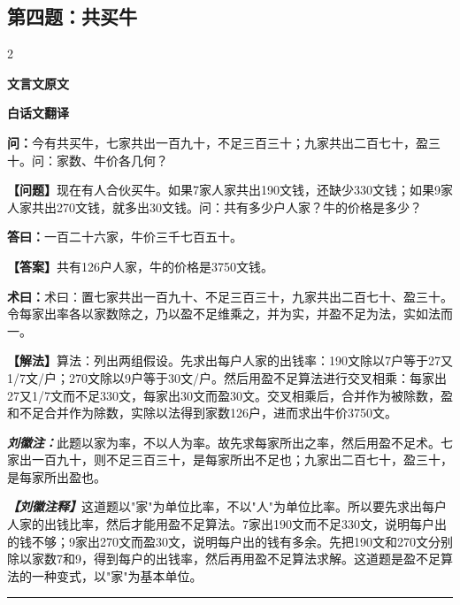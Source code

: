 \documentclass[10pt,a4paper]{article}
\newcommand{\wen}[1]{\textbf{\color{problemcolor}问：}#1\par}
\newcommand{\da}[1]{\textbf{答曰：}#1\par}
\newcommand{\shu}[1]{\textbf{术曰：}#1\par}
\newcommand{\liuhui}[1]{{\color{commentarycolor}\textit{\textbf{刘徽注：}}#1\par}}
\newcommand{\classicalheader}[1]{{\centering\large\bfseries\color{classicalcolor} #1\par\vspace{0.5em}}}
\newcommand{\wenmodern}[1]{\textbf{\color{moderncolor}【问题】}#1\par}
\newcommand{\damodern}[1]{\textbf{【答案】}#1\par}
\newcommand{\shumodern}[1]{\textbf{【解法】}#1\par}
\newcommand{\liuhuimodern}[1]{{\color{commentarycolor}\textit{\textbf{【刘徽注释】}}#1\par}}
\newcommand{\modernheader}[1]{{\centering\large\bfseries\color{moderncolor} #1\par\vspace{0.5em}}}
\newcommand{\problemsec}[1]{\subsection*{#1}}
\begin{document}
\problemsec{第四题：共买牛}
\begin{paracol}{2}
\classicalheader{文言文原文}
\switchcolumn
\modernheader{白话文翻译}
\switchcolumn*

\wen{今有共买牛，七家共出一百九十，不足三百三十；九家共出二百七十，盈三十。问：家数、牛价各几何？}

\switchcolumn

\wenmodern{现在有人合伙买牛。如果7家人家共出190文钱，还缺少330文钱；如果9家人家共出270文钱，就多出30文钱。问：共有多少户人家？牛的价格是多少？}

\switchcolumn*

\da{一百二十六家，牛价三千七百五十。}

\switchcolumn

\damodern{共有126户人家，牛的价格是3750文钱。}

\switchcolumn*

\shu{术曰：置七家共出一百九十、不足三百三十，九家共出二百七十、盈三十。令每家出率各以家数除之，乃以盈不足维乘之，并为实，并盈不足为法，实如法而一。}

\switchcolumn

\shumodern{算法：列出两组假设。先求出每户人家的出钱率：190文除以7户等于27又1/7文/户；270文除以9户等于30文/户。然后用盈不足算法进行交叉相乘：每家出27又1/7文而不足330文，每家出30文而盈30文。交叉相乘后，合并作为被除数，盈和不足合并作为除数，实除以法得到家数126户，进而求出牛价3750文。}

\switchcolumn*

\liuhui{此题以家为率，不以人为率。故先求每家所出之率，然后用盈不足术。七家出一百九十，则不足三百三十，是每家所出不足也；九家出二百七十，盈三十，是每家所出盈也。}

\switchcolumn

\liuhuimodern{这道题以"家"为单位比率，不以"人"为单位比率。所以要先求出每户人家的出钱比率，然后才能用盈不足算法。7家出190文而不足330文，说明每户出的钱不够；9家出270文而盈30文，说明每户出的钱有多余。先把190文和270文分别除以家数7和9，得到每户的出钱率，然后再用盈不足算法求解。这道题是盈不足算法的一种变式，以"家"为基本单位。}

\end{paracol}

\vspace{0.3cm}
\hrule
\vspace{0.3cm}
\end{document}
